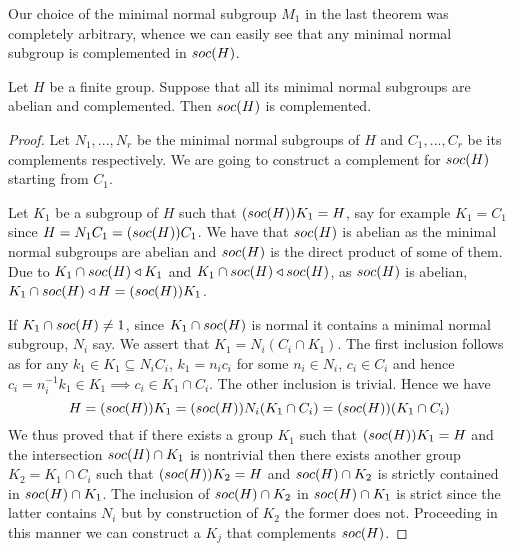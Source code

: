 Our choice of the minimal normal subgroup $M_1$ in the last theorem was completely arbitrary, whence we can easily see that any minimal normal subgroup is complemented in $soc {(H)}$.

 \begin{theorem}
    \label{th:SocC}
    Let $H$ be a finite group. Suppose that all its minimal normal subgroups are abelian and complemented. Then $soc {(H)}$ is complemented.
\end{theorem}

\begin{proof}
Let $N_1,...,N_r$ be the minimal normal subgroups of $H$ and $C_1,...,C_r$ be its complements respectively. We are going to construct a complement for $soc {(H)}$ starting from $C_1$.

Let $K_1$ be a subgroup of $H$ such that $(soc {(H)})K_1 = H$, say for example $K_1 = C_1$ since $H = N_1C_1 = (soc {(H)})C_1$.
We have that $soc {(H)}$ is abelian as the minimal normal subgroups are abelian and $soc {(H)}$ is the direct product of some of them.
Due to $K_1 \cap soc {(H)} \triangleleft K_1$ and $K_1 \cap soc {(H)} \triangleleft soc {(H)}$, as $soc {(H)}$ is abelian, $K_1 \cap soc {(H)} \triangleleft H = (soc {(H)}) K_1$.

If $K_1 \cap soc {(H)} \ne 1$, since $K_1 \cap soc {(H)}$ is normal it contains a minimal normal subgroup, $N_i$ say.
We assert that $K_1 = N_i(C_i \cap K_1)$. The first inclusion follows as for any $k_1 \in K_1 \subseteq N_iC_i$, $k_1 = n_ic_i$ for some $n_i \in N_i$, $c_i \in C_i$ and hence $c_i = n_i^{-1}k_1 \in K_1 \implies c_i \in K_1 \cap C_i$. The other inclusion is trivial. Hence we have
$$
H = (soc {(H)}) K_1 = (soc {(H)}) N_i(K_1 \cap C_i) = (soc {(H)}) (K_1 \cap C_i)
$$
We thus proved that if there exists a group $K_1$ such that $(soc {(H)}) K_1 = H$ and the intersection $soc {(H)} \cap K_1$ is nontrivial then there exists another group $K_2 = K_1 \cap C_i$ such that $(soc {(H)}) K_2 = H$ and $soc {(H)} \cap K_2$ is strictly contained in $soc {(H)} \cap K_1$. The inclusion of $soc {(H)} \cap K_2$ in $soc {(H)} \cap K_1$ is strict since the latter contains $N_i$ but by construction of $K_2$ the former does not. Proceeding in this manner we can construct a $K_j$ that complements $soc {(H)}$.

\end{proof}